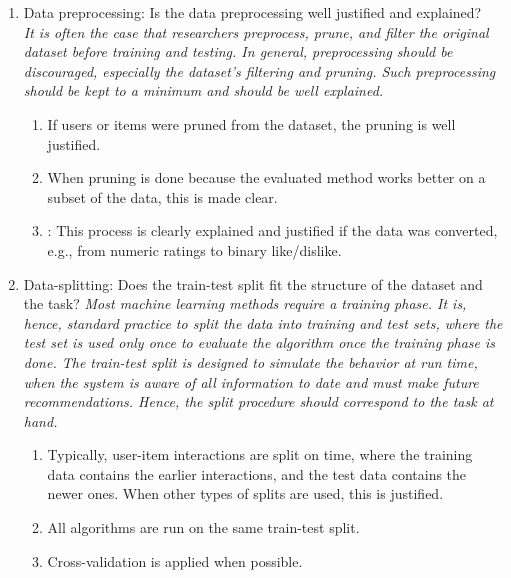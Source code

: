 \begin{enumerate}
    \item Data preprocessing: Is the data preprocessing well justified and explained? \\
    \emph{It is often the case that researchers preprocess, prune, and filter the original dataset before training and testing. In general, preprocessing should be discouraged, especially the dataset's filtering and pruning. Such preprocessing should be kept to a minimum and should be well explained.}
    \begin{enumerate} [label*=\arabic*.]
        \item If users or items were pruned from the dataset, the pruning is well justified.
        \item When pruning is done because the evaluated method works better on a subset of the data, this is made clear.
        \item: This process is clearly explained and justified if the data was converted, e.g., from numeric ratings to binary like/dislike.
    \end{enumerate}


    \item Data-splitting: Does the train-test split fit the structure of the dataset and the task?
    \emph{Most machine learning methods require a training phase. It is, hence, standard practice to split the data into training and test sets, where the test set is used only once to evaluate the algorithm once the training phase is done. The train-test split is designed to simulate the behavior at run time, when the system is aware of all information to date and must make future recommendations. Hence, the split procedure should correspond to the task at hand. }
 
    \begin{enumerate} [label*=\arabic*.]
        \item Typically, user-item interactions are split on time, where the training data contains the earlier interactions, and the test data contains the newer ones. When other types of splits are used, this is justified.
        \item All algorithms are run on the same train-test split.
        \item Cross-validation is applied when possible.
    \end{enumerate}
    

\end{enumerate}
